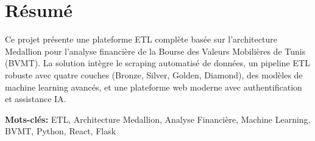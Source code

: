 \section*{Résumé}
Ce projet présente une plateforme ETL complète basée sur l'architecture Medallion pour l'analyse financière de la Bourse des Valeurs Mobilières de Tunis (BVMT). La solution intègre le scraping automatisé de données, un pipeline ETL robuste avec quatre couches (Bronze, Silver, Golden, Diamond), des modèles de machine learning avancés, et une plateforme web moderne avec authentification et assistance IA.

\textbf{Mots-clés:} ETL, Architecture Medallion, Analyse Financière, Machine Learning, BVMT, Python, React, Flask

\newpage
